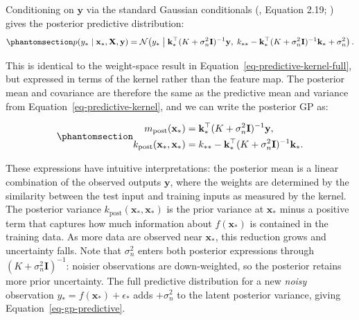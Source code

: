 \documentclass[
  letterpaper,
  DIV=11,
  numbers=noendperiod]{scrartcl}
\begin{document}
Conditioning on \(\mathbf{y}\) via the standard Gaussian conditionals
(,
Equation 2.19; ) gives the posterior predictive distribution:
\begin{equation}\phantomsection\label{eq-gp-predictive}{
p(y_* \mid \mathbf{x}_*, \mathbf{X}, \mathbf{y}) = \mathcal{N}\!\left(y_* \;\middle|\; \mathbf{k}_*^\top(K + \sigma_n^2\mathbf{I})^{-1}\mathbf{y},\; k_{**} - \mathbf{k}_*^\top(K+\sigma_n^2\mathbf{I})^{-1}\mathbf{k}_* + \sigma_n^2\right).
}\end{equation}

This is identical to the weight-space result in
Equation~\ref{eq-predictive-kernel-full}, but expressed in terms of the
kernel rather than the feature map. The posterior mean and covariance
are therefore the same as the predictive mean and variance from
Equation~\ref{eq-predictive-kernel}, and we can write the posterior GP
as:

\begin{equation}\phantomsection\label{eq-gp-posterior-moments}{
\begin{aligned}
m_{\text{post}}(\mathbf{x}_*) &= \mathbf{k}_*^\top(K + \sigma_n^2\mathbf{I})^{-1}\mathbf{y}, \\
k_{\text{post}}(\mathbf{x}_*, \mathbf{x}_*) &= k_{**} - \mathbf{k}_*^\top(K + \sigma_n^2\mathbf{I})^{-1}\mathbf{k}_*.
\end{aligned}
}\end{equation}

These expressions have intuitive interpretations: the posterior mean is
a linear combination of the observed outputs \(\mathbf{y}\), where the
weights are determined by the similarity between the test input and
training inputs as measured by the kernel. The posterior variance
\(k_{\text{post}}(\mathbf{x}_*, \mathbf{x}_*)\) is the prior variance at
\(\mathbf{x}_*\) minus a positive term that captures how much
information about \(f(\mathbf{x}_*)\) is contained in the training data.
As more data are observed near \(\mathbf{x}_*\), this reduction grows
and uncertainty falls. Note that \(\sigma_n^2\) enters both posterior
expressions through \((K + \sigma_n^2\mathbf{I})^{-1}\): noisier
observations are down-weighted, so the posterior retains more prior
uncertainty. The full predictive distribution for a new \emph{noisy}
observation \(y_* = f(\mathbf{x}_*) + \epsilon_*\) adds \(+\sigma_n^2\)
to the latent posterior variance, giving
Equation~\ref{eq-gp-predictive}.
\end{document}
